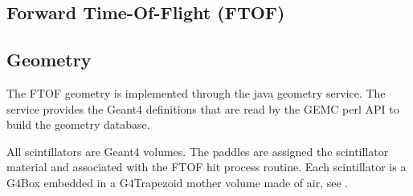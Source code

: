 \subsection{Forward Time-Of-Flight (FTOF)}

\subsection{Geometry}

The FTOF geometry is implemented through the java geometry service.
The service provides the Geant4 definitions that are read by the GEMC perl API to build the geometry database.

All scintillators are Geant4 volumes. The paddles are assigned the scintillator material and associated with the FTOF hit process routine.
Each scintillator is a G4Box embedded in a G4Trapezoid mother volume made of air, see . 

